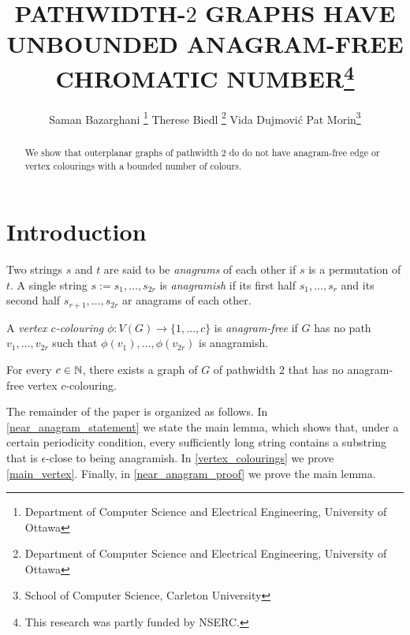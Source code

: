 \documentclass{patmorin}
\title{\MakeUppercase{Pathwidth-$2$ Graphs have Unbounded Anagram-Free Chromatic Number}\thanks{This research was partly funded by NSERC.}}
\author{Saman Bazarghani%
    \thanks{Department of Computer Science and Electrical Engineering, University of Ottawa}\qquad
    Therese Biedl%
    \thanks{Department of Computer Science and Electrical Engineering, University of Ottawa}\qquad
    Vida Dujmović\footnotemark[2]\qquad
    Pat Morin\footnotemark[3]%
    \thanks{School of Computer Science, Carleton University}}
\begin{document}
\maketitle

\begin{abstract}
    We show that outerplanar graphs of pathwidth $2$ do do not have anagram-free edge or vertex colourings with a bounded number of colours.
\end{abstract}

%


\section{Introduction}

Two strings $s$ and $t$ are said to be \emph{anagrams} of each other if $s$ is a permutation of $t$.  A single string $s:=s_1,\ldots,s_{2r}$ is \emph{anagramish} if its first half $s_1,\ldots,s_r$ and its second half $s_{r+1},\ldots,s_{2r}$ ar anagrams of each other.

A \emph{vertex $c$-colouring} $\phi:V(G)\to\{1,\ldots,c\}$ is \emph{anagram-free} if $G$ has no path $v_1,\ldots,v_{2r}$ such that $\phi(v_1),\ldots,\phi(v_{2r})$ is anagramish.



\begin{thm}\label{main_vertex}
    For every $c\in\mathbb{N}$, there exists a graph of $G$ of pathwidth $2$ that has no anagram-free vertex $c$-colouring.
\end{thm}

%
%



The remainder of the paper is organized as follows.  In \cref{near_anagram_statement} we state the main lemma, which shows that, under a certain periodicity condition, every sufficiently long string contains a substring that is $\epsilon$-close to being anagramish.
In \cref{vertex_colourings} we prove \cref{main_vertex}.  Finally, in \cref{near_anagram_proof} we prove the main lemma.
\end{document}
